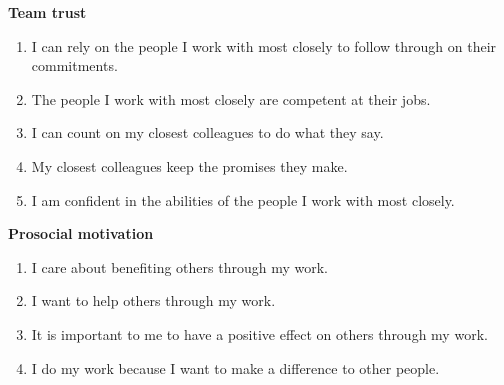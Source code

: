 \documentclass[12pt]{article}
\begin{document}
\noindent\textbf{Team trust} \citep{olumide2017}
\begin{enumerate}\setlength{\itemsep}{0pt}
\item I can rely on the people I work with most closely to follow through on their commitments.
\item The people I work with most closely are competent at their jobs.
\item I can count on my closest colleagues to do what they say.
\item My closest colleagues keep the promises they make.
\item I am confident in the abilities of the people I work with most closely.
\end{enumerate}

\noindent\textbf{Prosocial motivation} \citep{tesfaye2014}
\begin{enumerate}\setlength{\itemsep}{0pt}
\item I care about benefiting others through my work.
\item I want to help others through my work.
\item It is important to me to have a positive effect on others through my work.
\item I do my work because I want to make a difference to other people.
\end{enumerate}
\end{document}
